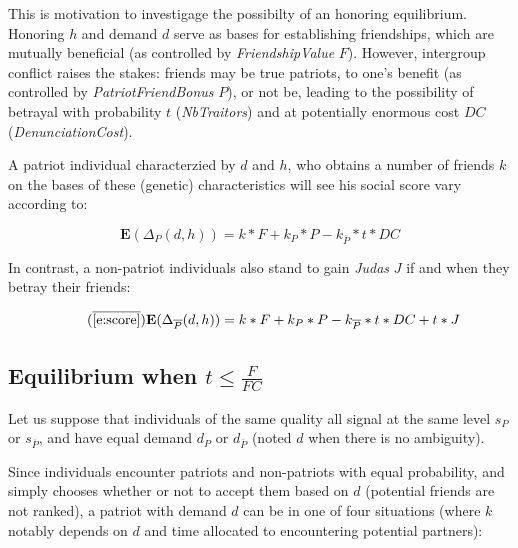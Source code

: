 \documentclass[a4paper,12pt]{report}
\begin{document}
This is motivation to investigage the possibilty of an honoring equilibrium. Honoring $h$
and demand $d$ serve as bases for establishing friendships, which are mutually beneficial
(as controlled by \emph{FriendshipValue} $F$). However, intergroup conflict raises the stakes:
friends may be true patriots, to one's benefit (as controlled by \emph{PatriotFriendBonus} $P$),
or not be, leading to the possibility of betrayal with probability $t$ (\emph{NbTraitors})
and at potentially enormous cost $DC$ (\emph{DenunciationCost}).

A patriot individual characterzied by $d$ and $h$, who obtains a number of friends $k$ on the
bases of these (genetic) characteristics will see his social score vary according to:

\begin{equation}
    \label{e:score}
    \mathbf{E}(\Delta_P(d,h)) = k*F + k_{P}*P - k_{\overline{P}}*t*DC
\end{equation}

In contrast, a non-patriot individuals also stand to gain \emph{Judas} $J$ if and when they
betray their friends:

\begin{equation}
    \tag{$\overline{\ref{e:score}}$}
    \label{e:score_NP}
    \mathbf{E}(\Delta_{\overline{P}}(d,h)) = k*F + k_{P}*P - k_{\overline{P}}*t*DC + t*J
\end{equation}



\subsection{Equilibrium when $t\leq \frac{F}{FC}$}
\label{s:null_ESS}











Let us suppose that 
individuals of the same quality all signal at the same level $s_{P}$ or $s_{\overline{P}}$,
and have equal demand $d_P$ or $d_{\overline{P}}$ (noted $d$ when there is no ambiguity).

Since individuals encounter patriots and non-patriots with equal probability,
and simply chooses whether or not to accept them based on $d$ (potential friends
are not ranked), a patriot with demand $d$ can be in one of four situations
(where $k$ notably depends on $d$ and time allocated to encountering
potential partners):
\end{document}
